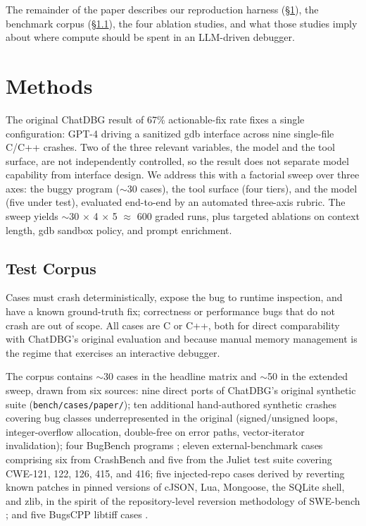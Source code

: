 \documentclass[11pt]{article}
\begin{document}
\noindent
The remainder of the paper describes our reproduction harness (\S\ref{sec:methods}), the benchmark corpus (\S\ref{sec:methods:corpus}), the four ablation studies, and what those studies imply about where compute should be spent in an LLM-driven debugger.

\section{Methods}
\label{sec:methods}

The original ChatDBG result of 67\% actionable-fix rate \citep{levin2024chatdbg} fixes a single configuration: GPT-4 driving a sanitized gdb interface across nine single-file C/C++ crashes. Two of the three relevant variables, the model and the tool surface, are not independently controlled, so the result does not separate model capability from interface design. We address this with a factorial sweep over three axes: the buggy program ($\sim$30 cases), the tool surface (four tiers), and the model (five under test), evaluated end-to-end by an automated three-axis rubric. The sweep yields $\sim$30 $\times$ 4 $\times$ 5 $\approx$ 600 graded runs, plus targeted ablations on context length, gdb sandbox policy, and prompt enrichment.

\subsection{Test Corpus}
\label{sec:methods:corpus}

Cases must crash deterministically, expose the bug to runtime inspection, and have a known ground-truth fix; correctness or performance bugs that do not crash are out of scope. All cases are C or C++, both for direct comparability with ChatDBG's original evaluation and because manual memory management is the regime that exercises an interactive debugger.

The corpus contains $\sim$30 cases in the headline matrix and $\sim$50 in the extended sweep, drawn from six sources: nine direct ports of ChatDBG's original synthetic suite (\texttt{bench/cases/paper/}); ten additional hand-authored synthetic crashes covering bug classes underrepresented in the original (signed/unsigned loops, integer-overflow allocation, double-free on error paths, vector-iterator invalidation); four BugBench programs \citep{lu2005bugbench}; eleven external-benchmark cases comprising six from CrashBench \citep{ortega2024crashbench} and five from the Juliet test suite \citep{juliet2017} covering CWE-121, 122, 126, 415, and 416; five injected-repo cases derived by reverting known patches in pinned versions of cJSON, Lua, Mongoose, the SQLite shell, and zlib, in the spirit of the repository-level reversion methodology of SWE-bench \citep{jimenez2024swebench}; and five BugsCPP libtiff cases \citep{an2023bugscpp}.
\end{document}
